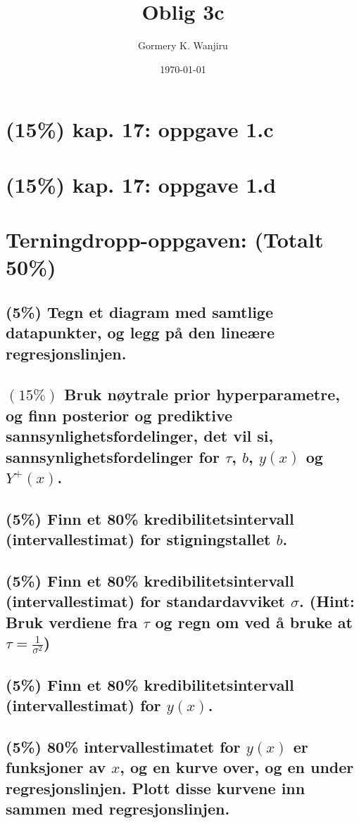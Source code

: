 \documentclass[12pt]{article}
\title{Oblig 3c}
\author{Gormery K. Wanjiru}
\date{\today}
\begin{document}
\maketitle

\newpage
\tableofcontents

\newpage

\section{(15\%) kap. 17: oppgave 1.c}
\section{(15\%) kap. 17: oppgave 1.d}
\section{Terningdropp-oppgaven: (Totalt 50\%)}
\subsection{(5\%) Tegn et diagram med samtlige datapunkter, og legg på den lineære regresjonslinjen.}
\subsection{ $(15\%)$ Bruk nøytrale prior hyperparametre, og finn posterior og prediktive sannsynlighetsfordelinger, det vil si, sannsynlighetsfordelinger for $\tau$, $b$, $y(x)$ og $Y^+(x)$.}
\subsection{(5\%) Finn et 80\% kredibilitetsintervall (intervallestimat) for stigningstallet $b$.}
\subsection{(5\%) Finn et 80\% kredibilitetsintervall (intervallestimat) for standardavviket $\sigma$. (Hint: Bruk verdiene fra $\tau$ og regn om ved å bruke at $\tau = \frac{1}{\sigma^2}$)}
\subsection{(5\%) Finn et 80\% kredibilitetsintervall (intervallestimat) for $y(x)$.}
\subsection{(5\%) 80\% intervallestimatet for $y(x)$ er funksjoner av $x$, og en kurve over, og en under regresjonslinjen. Plott disse kurvene inn sammen med regresjonslinjen.}
\end{document}
